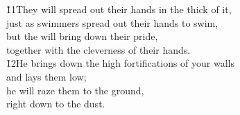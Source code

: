 \begin{poetry}
\poeml \v{11}They will spread out their hands in the thick of it, \\
\poemll    just as swimmers spread out their hands to swim, \\
\poeml but the  will bring down their pride, \\
\poemll    together with the cleverness of their hands. \\
\poeml \v{12}He brings down the high fortifications of your walls \\
\poemll    and lays them low; \\
\poeml he will raze them to the ground, \\
\poemll    right down to the dust.
\end{poetry}

